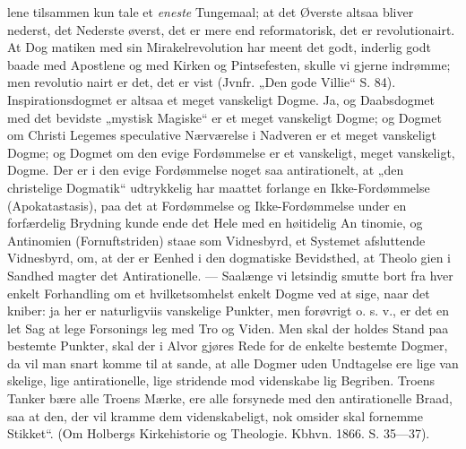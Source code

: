 \documentclass[12pt]{book}
\newcommand{\opage}[1]{\marginnote{\footnotesize\textit{[#1]}}}
\begin{document}
lene tilsammen kun tale et \emph{eneste} Tungemaal; at det
Øverste altsaa bliver nederst, det Nederste øverst, det er
mere end reformatorisk, det er revolutionairt. At Dog\-%
matiken med sin Mirakelrevolution har meent det godt,
inderlig godt baade med Apostlene og med Kirken og
Pintsefesten, skulle vi gjerne indrømme; men revolutio\-%
nairt er det, det er vist (Jvnfr. „Den gode Villie“ S.
84). Inspirationsdogmet er altsaa et meget vanskeligt
\opage{241}\setcounter{footnote}{0}%
Dogme. Ja, og Daabsdogmet med det bevidste „mystisk
Magiske“ er et meget vanskeligt Dogme; og Dogmet om
Christi Legemes speculative Nærværelse i Nadveren er
et meget vanskeligt Dogme; og Dogmet om den evige
Fordømmelse er et vanskeligt, meget vanskeligt, Dogme.
Der er i den evige Fordømmelse noget saa antirationelt,
at „den christelige Dogmatik“ udtrykkelig har maattet
forlange en Ikke-Fordømmelse (Apokatastasis), paa det at
Fordømmelse og Ikke-Fordømmelse under en forfærdelig
Brydning kunde ende det Hele med en høitidelig An\-%
tinomie, og Antinomien (Fornuftstriden) staae som
Vidnesbyrd, et Systemet afsluttende Vidnesbyrd, om, at
der er Eenhed i den dogmatiske Bevidsthed, at Theolo\-%
gien i Sandhed magter det Antirationelle. --- Saalænge
vi letsindig smutte bort fra hver enkelt Forhandling om
et hvilketsomhelst enkelt Dogme ved at sige, naar det
kniber: ja her er naturligviis vanskelige Punkter, men
forøvrigt o. s. v., er det en let Sag at lege Forsonings\-%
leg med Tro og Viden. Men skal der holdes Stand paa
bestemte Punkter, skal der i Alvor gjøres Rede for de
enkelte bestemte Dogmer, da vil man snart komme til
at sande, at alle Dogmer uden Undtagelse ere lige van\-%
skelige, lige antirationelle, lige stridende mod videnskabe\-%
lig Begriben. Troens Tanker bære alle Troens Mærke,
ere alle forsynede med den antirationelle Braad, saa at
den, der vil kramme dem videnskabeligt, nok omsider
skal fornemme Stikket“. (Om Holbergs Kirkehistorie og
Theologie. Kbhvn. 1866. S. 35---37).
\end{document}

